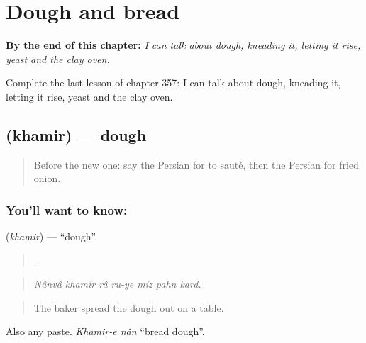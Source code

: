 
\chapter{Dough and bread}
\label{ch:fa-dough-and-bread}

\begin{chapteropening}
\textbf{By the end of this chapter:} \emph{I can talk about dough, kneading it, letting it rise, yeast and the clay oven.}

Complete the last lesson of chapter 357: I can talk about dough, kneading it, letting it rise, yeast and the clay oven.
\end{chapteropening}

\section[\texorpdfstring{\fa{خمیر} (khamir)}{خمیر (khamir)}]{ (khamir) — dough}

\label{lesson:FA-C357-khamir}



\begin{quote}
Before the new one: say the Persian for to sauté, then the Persian for fried onion.
\end{quote}

\subsection*{You'll want to know: }
\textbf{} (\emph{khamir}) — \textquotedblleft{}dough\textquotedblright{}.

\begin{quote}
      .
\end{quote}

\begin{quote}
\emph{Nânvâ khamir râ ru-ye miz pahn kard.}
\end{quote}

\begin{quote}
The baker spread the dough out on a table.
\end{quote}

Also any paste. \emph{Khamir-e nân} \textquotedblleft{}bread dough\textquotedblright{}.

